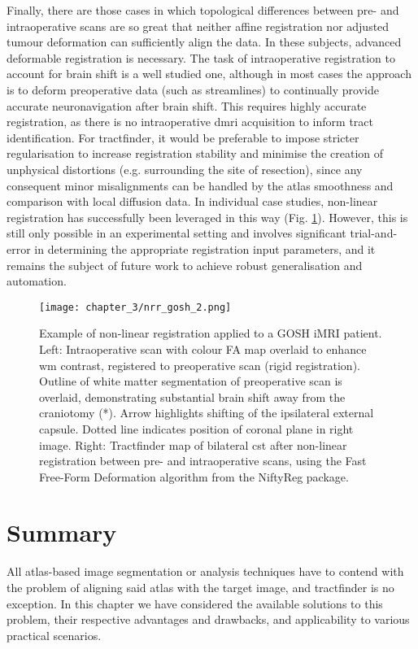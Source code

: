 Finally, there are those cases in which topological differences between pre- and intraoperative scans are so great that neither affine registration nor adjusted tumour deformation can sufficiently align the data.
In these subjects, advanced deformable registration is necessary.
The task of intraoperative registration to account for brain shift is a well studied one, although in most cases the approach is to deform preoperative data (such as streamlines) to continually provide accurate neuronavigation after brain shift.\autocite{Clatz2005,Archip2007,Wittek2007,Archip2008}
This requires highly accurate registration, as there is no intraoperative \gls{dmri} acquisition to inform tract identification.
For tractfinder, it would be preferable to impose stricter regularisation to increase registration stability and minimise the creation of unphysical distortions (e.g. surrounding the site of resection), since any consequent minor misalignments can be handled by the atlas smoothness and comparison with local diffusion data.
In individual case studies, non-linear registration has successfully been leveraged in this way (Fig. \ref{fig:nrrex}).
However, this is still only possible in an experimental setting and involves significant trial-and-error in determining the appropriate registration input parameters, and it remains the subject of future work to achieve robust generalisation and automation.

\begin{figure}[hb!]
  \centering
  \texttt{[image: chapter\_3/nrr\_gosh\_2.png]}
  \caption{Example of non-linear registration applied to a GOSH iMRI patient. Left: Intraoperative scan with colour FA map overlaid to enhance \gls{wm} contrast, registered to preoperative scan (rigid registration). Outline of white matter segmentation of preoperative scan is overlaid, demonstrating substantial brain shift away from the craniotomy (*). Arrow highlights shifting of the ipsilateral external capsule. Dotted line indicates position of coronal plane in right image. Right: Tractfinder map of bilateral \gls{cst} after non-linear registration between pre- and intraoperative scans, using the Fast Free-Form Deformation algorithm from the NiftyReg package.}
  \label{fig:nrrex}
\end{figure}

\section{Summary}

All atlas-based image segmentation or analysis techniques have to contend with the problem of aligning said atlas with the target image, and tractfinder is no exception.
In this chapter we have considered the available solutions to this problem, their respective advantages and drawbacks, and applicability to various practical scenarios.

